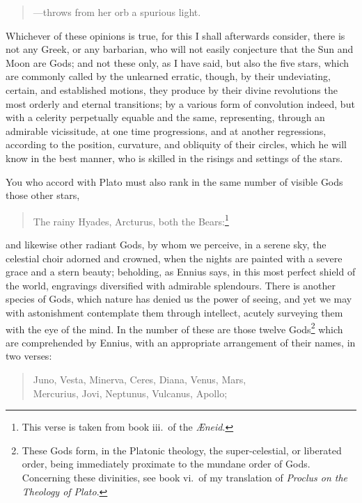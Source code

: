 \documentclass[twoside]{article}
\begin{document}
\begin{verse}
---throws from her orb a spurious light. 
\end{verse}

\noindent Whichever of these opinions is true, for this I shall afterwards
consider, there is not any Greek, or any barbarian, who will not easily
conjecture that the Sun and Moon are Gods; and not these only, as I have said,
but also the five stars, which are commonly called by the unlearned erratic,
though, by their undeviating, certain, and established motions, they produce by
their divine revolutions the most orderly and eternal transitions; by a various
form of convolution indeed, but with a celerity perpetually equable and the
same, representing, through an admirable vicissitude, at one time progressions,
and at another regressions, according to the position, curvature, and obliquity
of their circles, which he will know in the best manner, who is skilled in the
risings and settings of the stars.

You who accord with Plato must also rank in the same number of visible Gods
those other stars,

\begin{verse}
The rainy Hyades, Arcturus, both the Bears:\footnote{This verse is taken from
book iii.~of the \textit{{\AE}neid}.}
\end{verse}

\noindent and likewise other radiant Gods, by whom we perceive, in a serene
sky, the celestial choir adorned and crowned, when the nights are painted with
a severe grace and a stern beauty; beholding, as Ennius says, in this most
perfect shield of the world, engravings diversified with admirable splendours.
There is another species of Gods, which nature has denied us the power of
seeing, and yet we may with astonishment contemplate them through intellect,
acutely surveying them with the eye of the mind. In the number of these are
those twelve Gods\footnote{These Gods form, in the Platonic theology, the
super-celestial, or liberated order, being immediately proximate to the mundane
order of Gods. Concerning these divinities, see book vi.~of my translation of
\textit{Proclus on the Theology of Plato}.} which are comprehended by Ennius,
with an appropriate arrangement of their names, in two verses:

\begin{verse}
Juno, Vesta, Minerva, Ceres, Diana, Venus, Mars,\\
Mercurius, Jovi, Neptunus, Vulcanus, Apollo;
\end{verse}
\end{document}
